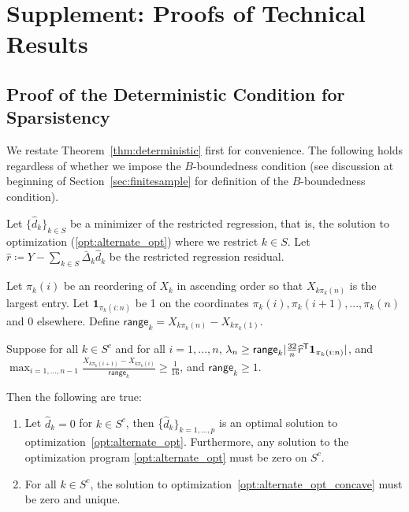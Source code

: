 
\section{Supplement:  Proofs of Technical Results}
 
 
 \subsection{Proof of the Deterministic Condition for Sparsistency}
 \label{sec:deterministic_proof}
 
We restate Theorem~\ref{thm:deterministic} first for convenience. 
The following holds regardless of whether we impose the $B$-boundedness condition (see discussion at beginning of Section~\ref{sec:finitesample} for definition of the $B$-boundedness condition).
 
\begin{theorem} 
Let $\{\hat{d}_k \}_{k \in S}$ be a minimizer of the restricted regression, that is, the solution to optimization (\ref{opt:alternate_opt}) where we restrict $k \in S$. 
Let $\hat{r} \coloneqq Y - \sum_{k \in S} \bar{\Delta}_k \hat{d}_k$ be the restricted regression residual. 


Let $\pi_k(i)$ be an reordering of $X_k$ in ascending order so that $X_{k \pi_k(n)}$ is the largest entry. Let $\mathbf{1}_{\pi_k(i:n)}$ be 1 on the coordinates $\pi_k(i),\pi_k(i+1),...,\pi_k(n)$ and 0 elsewhere. Define $\mathsf{range}_k = X_{k\pi_k(n)} - X_{k \pi_k(1)}$.

Suppose for all $k\in S^c$ and for all $i=1,...,n$, $\lambda_n \geq \mathsf{range}_k | \frac{32}{n} \widehat{r}^{\mathsf{T}} \mbox{\boldmath $1$}_{\pi_k(i:n)}|$, and $\max_{i=1,...,n-1} \frac{X_{k\pi_k(i+1)} - X_{k\pi_k(i)}}{\mathsf{range}_k} \geq \frac{1}{16}$, and $\mathsf{range}_k \geq 1$.

Then the following are true:
\begin{enumerate}
\item Let $\hat{d}_k = 0$ for $k \in S^c$, then \{$\hat{d}_k\}_{k=1,...,p}$ is an optimal solution to optimization~\ref{opt:alternate_opt}. Furthermore, any solution to the optimization program \ref{opt:alternate_opt} must be zero on $S^c$.
\item For all $k \in S^c$, the solution to optimization~\ref{opt:alternate_opt_concave} must be zero and unique.
\end{enumerate}
\end{theorem}



